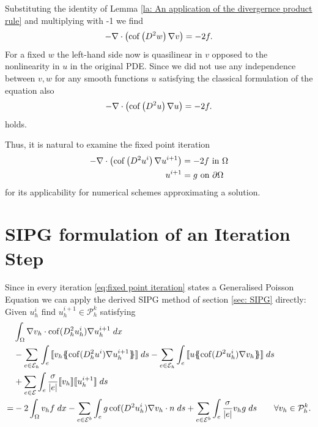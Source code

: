 Substituting the identity of Lemma \ref{la: An application of the divergernce product rule} and multiplying with -1 we find
\begin{align}
	- \nabla \cdot \left( \operatorname{cof} \left(  D^2 w \right) \nabla v \right)  = -2f.  \label{eq:decoupled PDE}
\end{align}
For a fixed $w$ the left-hand side now is quasilinear in $v$ opposed to the nonlinearity in $u$ in the original PDE. Since we did not use any independence between $v,w$ for any smooth functions $u$ satisfying the classical formulation of the \MA equation also 
\begin{align}
- \nabla \cdot \left( \operatorname{cof} \left(  D^2 u \right) \nabla u \right)  = -2f.  \label{eq: analytical fixed point iteration}
\end{align}
holds. 

Thus, it is natural to examine the fixed point iteration
\begin{align}
	\begin{split}
	- \nabla \cdot \left( \operatorname{cof} \left(  D^2 u^i \right) \nabla u^{i+1} \right)  &= -2f  \text{ in } \Omega \\
		u^{i+1} &= g \textnormal{ on } \partial \Omega
	\label{eq:fixed point iteration}
	\end{split}
\end{align}
for its applicability for numerical schemes approximating a \MA solution.

\section{SIPG formulation of an Iteration Step}\label{sec: SIPG MA}
Since in every iteration \eqref{eq:fixed point iteration} states a Generalised Poisson Equation we can apply the derived  SIPG method of section \ref{sec: SIPG} directly: Given $u^i_h$ find $u^{i+1}_h \in \mathcal P^k_h$ satisfying
\begin{align}
 &\myIntX {\Omega} {\nabla v_h \cdot \cof(D_h^2 u_h^{i}) \nabla u_h^{i+1}}  \nonumber\\
 & -\sum\limits_{e \in \edges}\myIntS e { \jump {v_h \average { \cof(D_h^2 u^{i}) \nabla u_h^{i+1}} }}
 - \sum\limits_{e \in \edges}\myIntS e { \jump {u \average{ \cof(D^2 u_h^{i}) \nabla v_h} }} \nonumber\\  
 &  +\sum\limits_{e \in \bigEps} \myIntS e { \frac \sigma {|e|} \jump {v_h}  \jump {u_h^{i+1}}}\nonumber\\
    =& - 2 \myIntX {\Omega} {v_h f}
    	 				-\sum\limits_{e \in \bigEps^b}\myIntS e {g \cof(D^2 u_h^{i}) \nabla v_h \cdot n }
    	 				+\sum\limits_{e \in \bigEps^b} \myIntS e { \frac \sigma {|e|} v_h g}    \qquad \forall v_h \in  \mathcal P^k_h.
    	\label{eq: sipg iteration}
\end{align}

